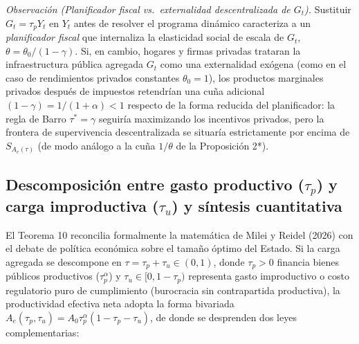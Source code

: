 \documentclass[11pt,letterpaper]{article}
\theoremstyle{plain}
\begin{document}
\noindent\emph{Observación (Planificador fiscal vs.\ externalidad descentralizada de $G_t$).} Sustituir $G_t=\tau_p Y_t$ en $Y_t$ antes de resolver el programa dinámico caracteriza a un \emph{planificador fiscal} que internaliza la elasticidad social de escala de $G_t$, $\theta=\theta_0/(1-\gamma)$. Si, en cambio, hogares y firmas privadas trataran la infraestructura pública agregada $G_t$ como una externalidad exógena (como en el caso de rendimientos privados constantes $\theta_0=1$), los productos marginales privados después de impuestos retendrían una cuña adicional $(1-\gamma)=1/(1+\alpha)<1$ respecto de la forma reducida del planificador: la regla de Barro $\tau^*=\gamma$ seguiría maximizando los incentivos privados, pero la frontera de supervivencia descentralizada se situaría estrictamente por encima de $S_{A_e(\tau)}$ (de modo análogo a la cuña $1/\theta$ de la Proposición 2*).

\subsection{\texorpdfstring{Descomposición entre gasto productivo ($\tau_p$) y carga improductiva ($\tau_u$) y síntesis cuantitativa}{Descomposición entre gasto productivo (tau\_p) y carga improductiva (tau\_u) y síntesis cuantitativa}}

El Teorema 10 reconcilia formalmente la matemática de Milei y Reidel (2026) con el debate de política económica sobre el tamaño óptimo del Estado. Si la carga agregada se descompone en $\tau=\tau_p+\tau_u\in(0,1)$, donde $\tau_p>0$ financia bienes públicos productivos ($\tau_p^\alpha$) y $\tau_u\in[0,1-\tau_p)$ representa gasto improductivo o costo regulatorio puro de cumplimiento (burocracia sin contrapartida productiva), la productividad efectiva neta adopta la forma bivariada $A_e(\tau_p,\tau_u)=A_0\tau_p^\alpha(1-\tau_p-\tau_u)$, de donde se desprenden dos leyes complementarias:
\end{document}
